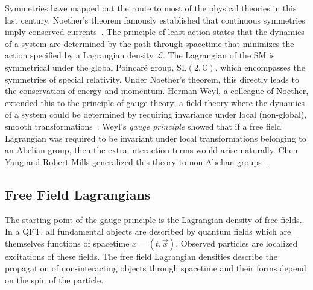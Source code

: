 Symmetries have mapped out the route to most of the physical theories in this last century.
Noether's theorem famously established that continuous symmetries imply conserved currents~\cite{Noether1918}.
The principle of least action states that the dynamics of a system are determined by the path through spacetime that minimizes the action specified by a Lagrangian density $\mathcal{L}$.
The Lagrangian of the SM is symmetrical under the global Poincaré group, $\text{SL}(2, \mathbb{C})$, which encompasses the symmetries of special relativity.
Under Noether's theorem, this directly leads to the conservation of energy and momentum.
Herman Weyl, a colleague of Noether, extended this to the principle of gauge theory; a field theory where the dynamics of a system could be determined by requiring invariance under local (non-global), smooth transformations~\cite{GaugeSym}.
Weyl's \textit{gauge principle} showed that if a free field Lagrangian was required to be invariant under local transformations belonging to an Abelian group, then the extra interaction terms would arise naturally.
Chen Yang and Robert Mills generalized this theory to non-Abelian groups~\cite{YangMills}.

\subsection{Free Field Lagrangians}

The starting point of the gauge principle is the Lagrangian density of free fields.
In a QFT, all fundamental objects are described by quantum fields which are themselves functions of spacetime $x = (t, \vec{x})$.
Observed particles are localized excitations of these fields.
The free field Lagrangian densities describe the propagation of non-interacting objects through spacetime and their forms depend on the spin of the particle.

